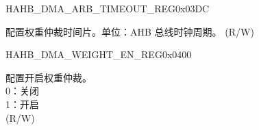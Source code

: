 \begin{register}{H}{AHB\_DMA\_ARB\_TIMEOUT\_REG}{0x03DC}\label{regdesc:AHBDMAARBTIMEOUTREG}
%
%
\regnewline%
\begin{regdesc}\begin{reglist}
\label{fielddesc:AHBDMAARBTIMEOUT}\item [AHB\_DMA\_ARB\_TIMEOUT] 配置权重仲裁时间片。单位：AHB 总线时钟周期。 (R/W)
\end{reglist}\end{regdesc}
\end{register}


\begin{register}{H}{AHB\_DMA\_WEIGHT\_EN\_REG}{0x0400}\label{regdesc:AHBDMAWEIGHTENREG}
%
%
\regnewline%
\begin{regdesc}\begin{reglist}
\label{fielddesc:AHBDMAWEIGHTEN}\item [AHB\_DMA\_WEIGHT\_EN] 配置开启权重仲裁。\\
0：关闭\\
1：开启\\ (R/W)
\end{reglist}\end{regdesc}
\end{register}


